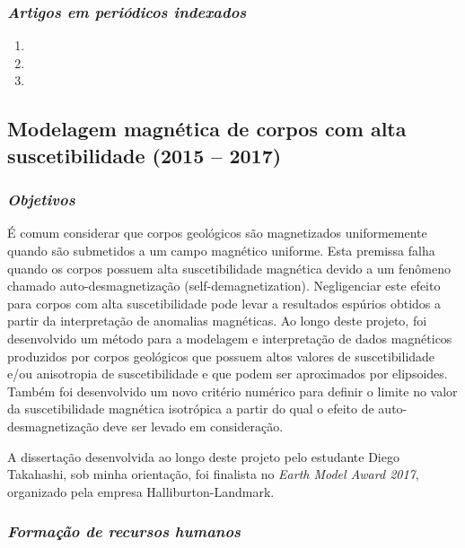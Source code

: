\subsubsection{\emph{Artigos em periódicos indexados}}

\begin{enumerate}
	\item {}
	\item {}
	\item {}
	
\end{enumerate}


\subsection{Modelagem magnética de corpos com alta suscetibilidade (2015 -- 2017)} \label{projeto-Diego}

\subsubsection{\emph{Objetivos}}

É comum considerar que corpos geológicos são magnetizados uniformemente quando são 
submetidos a um campo magnético uniforme. Esta premissa falha quando os corpos possuem 
alta suscetibilidade magnética devido a um fenômeno chamado auto-desmagnetização 
(self-demagnetization). Negligenciar este efeito para corpos com alta suscetibilidade 
pode levar a resultados espúrios obtidos a partir da interpretação de anomalias 
magnéticas. 
Ao longo deste projeto, foi desenvolvido um método para a modelagem e interpretação 
de dados magnéticos produzidos por corpos geológicos que possuem altos valores de 
suscetibilidade e/ou anisotropia de suscetibilidade e que podem ser aproximados por 
elipsoides. Também foi desenvolvido um novo critério numérico para definir o limite 
no valor da suscetibilidade magnética isotrópica a partir do qual o efeito de 
auto-desmagnetização deve ser levado em consideração.

A dissertação desenvolvida ao longo deste projeto pelo estudante Diego Takahashi, sob 
minha orientação, foi finalista no \textit{Earth Model Award 2017}, organizado pela 
empresa Halliburton-Landmark.

\subsubsection{\emph{Formação de recursos humanos}}

